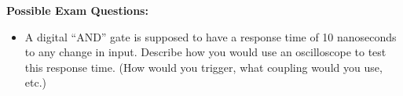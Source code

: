 \textbf{Possible Exam Questions:}

\begin{itemize}

\item A digital ``AND'' gate is supposed to have a response time of 10 nanoseconds to any change in input.  Describe how you would use an oscilloscope to test this response time.  (How would you trigger, what coupling would you use, etc.) 

\end{itemize}








